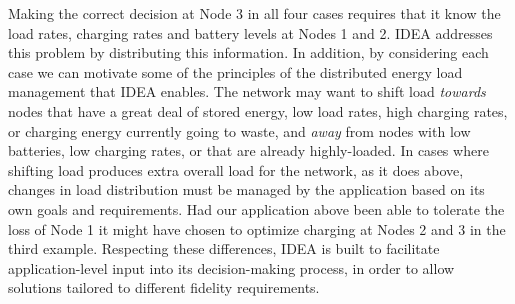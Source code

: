 Making the correct decision at Node 3 in all four cases requires that it know
the load rates, charging rates and battery levels at Nodes 1 and 2. IDEA
addresses this problem by distributing this information. In addition, by
considering each case we can motivate some of the principles of the
distributed energy load management that IDEA enables. The network may want to
shift load \textit{towards} nodes that have a great deal of stored energy,
low load rates, high charging rates, or charging energy currently going to
waste, and \textit{away} from nodes with low batteries, low charging rates,
or that are already highly-loaded. In cases where shifting load produces
extra overall load for the network, as it does above, changes in load
distribution must be managed by the application based on its own goals and
requirements. Had our application above been able to tolerate the loss of
Node 1 it might have chosen to optimize charging at Nodes 2 and 3 in the
third example. Respecting these differences, IDEA is built to facilitate
application-level input into its decision-making process, in order to allow
solutions tailored to different fidelity requirements.
